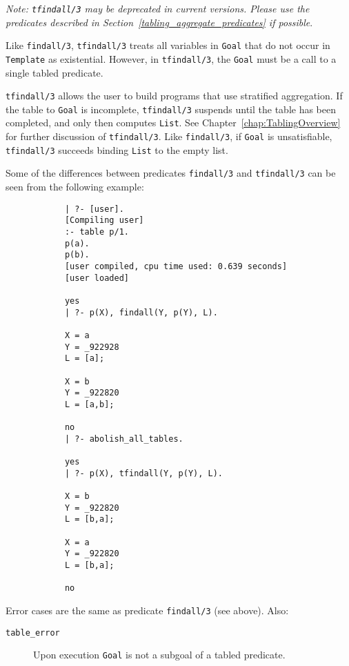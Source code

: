 \begin{description}
\label{tfindall/3}

    {\em Note: {\tt tfindall/3} may be deprecated in current versions.
    Please use the predicates described in
    Section~\ref{tabling_aggregate_predicates} if possible}.

    Like {\tt findall/3}, {\tt tfindall/3} treats all variables in
    {\tt Goal} that do not occur in {\tt Template} as existential.  However,
    in {\tt tfindall/3}, the {\tt Goal} must be a call to a single
    tabled predicate.
	
    {\tt tfindall/3} allows the user to build programs that use
    stratified aggregation.  If the table to {\tt Goal} is incomplete,
    {\tt tfindall/3} suspends until the table has been completed, and
    only then computes {\tt List}.  See Chapter~\ref{chap:TablingOverview}
    for further discussion of {\tt tfindall/3}.  Like {\tt findall/3},
    if {\tt Goal} is unsatisfiable, {\tt tfindall/3} succeeds binding
    {\tt List} to the empty list.

    Some of the differences between predicates {\tt findall/3} and
    {\tt tfindall/3} can be seen from the following example:

    {\footnotesize
    \begin{verbatim}
            | ?- [user].
            [Compiling user]
            :- table p/1.
            p(a).
            p(b).
            [user compiled, cpu time used: 0.639 seconds]
            [user loaded]

            yes
            | ?- p(X), findall(Y, p(Y), L).

            X = a
            Y = _922928
            L = [a];

            X = b
            Y = _922820
            L = [a,b];

            no
            | ?- abolish_all_tables.

            yes
            | ?- p(X), tfindall(Y, p(Y), L).

            X = b
            Y = _922820
            L = [b,a];

            X = a
            Y = _922820
            L = [b,a];

            no
    \end{verbatim}
    }

    Error cases are the same as predicate {\tt findall/3} (see above).
    Also:
    \begin{description}
    \item[{\tt table\_error}]
	Upon execution {\tt Goal} is not a subgoal of a tabled predicate.
    \end{description}


\end{description}
